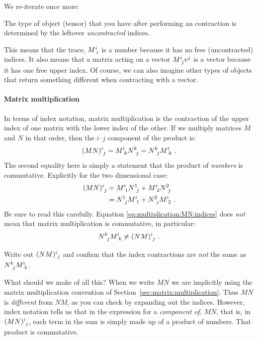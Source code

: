 We re-iterate once more:
\begin{newrule} The type of object (tensor) that you have after performing an contraction is determined by the leftover \emph{uncontracted} indices.
\end{newrule}
This means that the trace, $M\aij{i}{i}$ is a number because it has no free (uncontracted) indices. It also means that a matrix acting on a vector $M\aij{i}{j}v^j$ is a vector because it has one free upper index. Of course, we can also imagine other types of objects that return something different when contracting with a vector.

\paragraph{Matrix multiplication} In terms of index notation, matrix multiplication is the contraction of the upper index of one matrix with the lower index of the other. If we multiply matrices $M$ and $N$ in that order, then the $i$--$j$ component of the product is:
\begin{align}
    (MN)\aij{i}{j} =   M\aij{i}{k} N\aij{k}{j}  = N\aij{k}{j} M\aij{i}{k} \ .\label{eq:multiplication:MN:indices}
\end{align}
The second equality here is simply a statement that the product of \emph{numbers} is commutative. Explicitly for the two dimensional case:
\begin{align}
    (MN)\aij{i}{j} &= 
    M\aij{i}{1} N\aij{1}{j} + M\aij{i}{2} N\aij{2}{j}\\
    &=
    N\aij{1}{j} M\aij{i}{1}  + N\aij{2}{j} M\aij{i}{2} \ .
\end{align}
Be sure to read this carefully. Equation \eqref{eq:multiplication:MN:indices} does \emph{not} mean that matrix multiplication is commutative, in particular:
\begin{align}
    N\aij{k}{j} M\aij{i}{k} \neq (NM)\aij{i}{j} \ .
\end{align}
\begin{exercise}
Write out $(NM)\aij{i}{j}$ and confirm that the index contractions are \emph{not} the same as $N\aij{k}{j} M\aij{i}{k}$.
\end{exercise}
What should we make of all this? When we write $MN$ we are implicitly using the matrix multiplication convention of Section~\ref{sec:matrix:multiplication}. Thus $MN$ is \emph{different} from $NM$, as you can check by expanding out the indices. However, index notation tells us that in the expression for a \emph{component of}, $MN$, that is, in $(MN)\aij{i}{j}$, each term in the sum is simply made up of a product of numbers. That product is commutative. 

